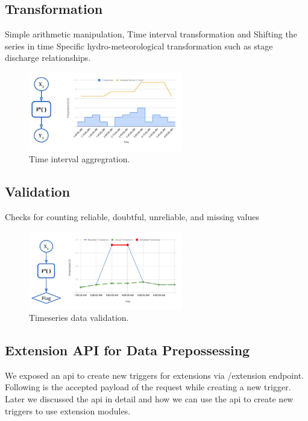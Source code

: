 \subsection{Transformation}
Simple arithmetic manipulation, Time interval transformation and Shifting the series in time Specific hydro-meteorological transformation such as stage discharge relationships.
\begin{figure}[htp]
    \centering
    \includegraphics[width=0.6\textwidth]{method/data_preprocess/transformation.jpg}
    \caption{Time interval aggregration.}
    \label{fi:transformation}
\end{figure}

\subsection{Validation}
Checks for counting reliable, doubtful, unreliable, and missing values
\begin{figure}[htp]
    \centering
    \includegraphics[width=0.6\textwidth]{method/data_preprocess/validation.jpg}
    \caption{Timeseries data validation.}
    \label{fi:validation}
\end{figure}

\subsection{Extension API for Data Prepossessing}

We exposed an \acrshort{api} to create new triggers for extensions via /extension endpoint. Following is the accepted payload of the request while creating a new trigger. Later we discussed the \acrshort{api} in detail and how we can use the \acrshort{api} to create new triggers to use extension modules.

